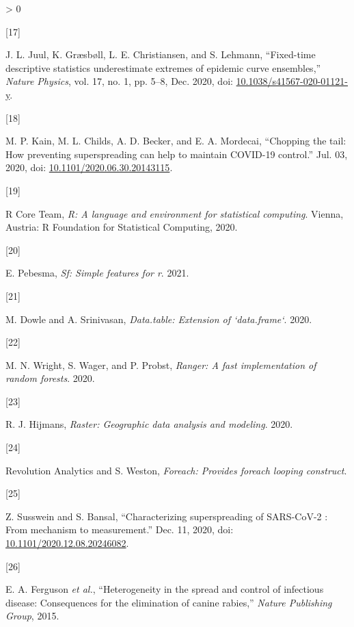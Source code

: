 \documentclass[
  oneside]{book}
\newlength{\cslhangindent}
\newlength{\csllabelwidth}
\newenvironment{CSLReferences}[2] %
 {%
  \setlength{\parindent}{0pt}
  \ifodd #1 \everypar{\setlength{\hangindent}{\cslhangindent}}\ignorespaces\fi
  \ifnum #2 > 0
  \setlength{\parskip}{#2\baselineskip}
  \fi
 }%
 {}
\newcommand{\CSLLeftMargin}[1]{\parbox[t]{\csllabelwidth}{#1}}
\newcommand{\CSLRightInline}[1]{\parbox[t]{\linewidth - \csllabelwidth}{#1}\break}
\begin{document}
\begin{CSLReferences}{0}{0}
\leavevmode\hypertarget{ref-juul2020}{}%
\CSLLeftMargin{{[}17{]} }
\CSLRightInline{J. L. Juul, K. Græsbøll, L. E. Christiansen, and S. Lehmann, {``Fixed-time descriptive statistics underestimate extremes of epidemic curve ensembles,''} \emph{Nature Physics}, vol. 17, no. 1, pp. 5--8, Dec. 2020, doi: \href{https://doi.org/10.1038/s41567-020-01121-y}{10.1038/s41567-020-01121-y}.}

\leavevmode\hypertarget{ref-Kain2020}{}%
\CSLLeftMargin{{[}18{]} }
\CSLRightInline{M. P. Kain, M. L. Childs, A. D. Becker, and E. A. Mordecai, {``Chopping the tail: How preventing superspreading can help to maintain COVID-19 control.''} Jul. 03, 2020, doi: \href{https://doi.org/10.1101/2020.06.30.20143115}{10.1101/2020.06.30.20143115}.}

\leavevmode\hypertarget{ref-R-program}{}%
\CSLLeftMargin{{[}19{]} }
\CSLRightInline{R Core Team, \emph{R: A language and environment for statistical computing}. Vienna, Austria: R Foundation for Statistical Computing, 2020.}

\leavevmode\hypertarget{ref-R-sf}{}%
\CSLLeftMargin{{[}20{]} }
\CSLRightInline{E. Pebesma, \emph{Sf: Simple features for r}. 2021.}

\leavevmode\hypertarget{ref-R-data.table}{}%
\CSLLeftMargin{{[}21{]} }
\CSLRightInline{M. Dowle and A. Srinivasan, \emph{Data.table: Extension of `data.frame`}. 2020.}

\leavevmode\hypertarget{ref-R-ranger}{}%
\CSLLeftMargin{{[}22{]} }
\CSLRightInline{M. N. Wright, S. Wager, and P. Probst, \emph{Ranger: A fast implementation of random forests}. 2020.}

\leavevmode\hypertarget{ref-R-raster}{}%
\CSLLeftMargin{{[}23{]} }
\CSLRightInline{R. J. Hijmans, \emph{Raster: Geographic data analysis and modeling}. 2020.}

\leavevmode\hypertarget{ref-R-foreach}{}%
\CSLLeftMargin{{[}24{]} }
\CSLRightInline{Revolution Analytics and S. Weston, \emph{Foreach: Provides foreach looping construct}.}

\leavevmode\hypertarget{ref-susswein2020}{}%
\CSLLeftMargin{{[}25{]} }
\CSLRightInline{Z. Susswein and S. Bansal, {``Characterizing superspreading of SARS-CoV-2 : From mechanism to measurement.''} Dec. 11, 2020, doi: \href{https://doi.org/10.1101/2020.12.08.20246082}{10.1101/2020.12.08.20246082}.}

\leavevmode\hypertarget{ref-ferguson2015}{}%
\CSLLeftMargin{{[}26{]} }
\CSLRightInline{E. A. Ferguson \emph{et al.}, {``Heterogeneity in the spread and control of infectious disease: Consequences for the elimination of canine rabies,''} \emph{Nature Publishing Group}, 2015.}


\end{CSLReferences}
\end{document}
